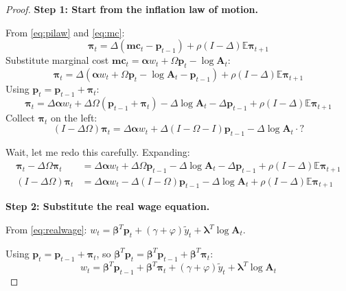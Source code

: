 \documentclass[12pt]{article}
\begin{document}
\begin{proof}

\textbf{Step 1: Start from the inflation law of motion.}

From \eqref{eq:pilaw} and \eqref{eq:mc}:
\begin{equation}
    \bm{\pi}_t = \Delta(\bm{mc}_t - \bm{p}_{t-1}) + \rho(I-\Delta)\mathbb{E}\bm{\pi}_{t+1}
\end{equation}
Substitute marginal cost $\bm{mc}_t = \bm{\alpha}w_t + \Omega\bm{p}_t - \log\mathbf{A}_t$:
\begin{equation}
    \bm{\pi}_t = \Delta(\bm{\alpha}w_t + \Omega\bm{p}_t - \log\mathbf{A}_t - \bm{p}_{t-1}) + \rho(I-\Delta)\mathbb{E}\bm{\pi}_{t+1}
    \label{eq:step1a}
\end{equation}
Using $\bm{p}_t = \bm{p}_{t-1} + \bm{\pi}_t$:
\begin{equation}
    \bm{\pi}_t = \Delta\bm{\alpha}w_t + \Delta\Omega(\bm{p}_{t-1} + \bm{\pi}_t) - \Delta\log\mathbf{A}_t - \Delta\bm{p}_{t-1} + \rho(I-\Delta)\mathbb{E}\bm{\pi}_{t+1}
\end{equation}
Collect $\bm{\pi}_t$ on the left:
\begin{equation}
    (I - \Delta\Omega)\bm{\pi}_t = \Delta\bm{\alpha}w_t + \Delta(I-\Omega-I)\bm{p}_{t-1} - \Delta\log\mathbf{A}_t \cdot?
\end{equation}

Wait, let me redo this carefully. Expanding:
\begin{align}
    \bm{\pi}_t - \Delta\Omega\bm{\pi}_t &= \Delta\bm{\alpha}w_t + \Delta\Omega\bm{p}_{t-1} - \Delta\log\mathbf{A}_t - \Delta\bm{p}_{t-1} + \rho(I-\Delta)\mathbb{E}\bm{\pi}_{t+1} \nonumber\\
    (I-\Delta\Omega)\bm{\pi}_t &= \Delta\bm{\alpha}w_t - \Delta(I-\Omega)\bm{p}_{t-1} - \Delta\log\mathbf{A}_t + \rho(I-\Delta)\mathbb{E}\bm{\pi}_{t+1}
    \label{eq:step1b}
\end{align}

\medskip
\textbf{Step 2: Substitute the real wage equation.}

From \eqref{eq:realwage}: $w_t = \bm{\beta}^T\bm{p}_t + (\gamma+\varphi)\tilde{y}_t + \bm{\lambda}^T\log\mathbf{A}_t$.

Using $\bm{p}_t = \bm{p}_{t-1} + \bm{\pi}_t$, so $\bm{\beta}^T\bm{p}_t = \bm{\beta}^T\bm{p}_{t-1} + \bm{\beta}^T\bm{\pi}_t$:
\begin{equation}
    w_t = \bm{\beta}^T\bm{p}_{t-1} + \bm{\beta}^T\bm{\pi}_t + (\gamma+\varphi)\tilde{y}_t + \bm{\lambda}^T\log\mathbf{A}_t
\end{equation}


\end{proof}
\end{document}
